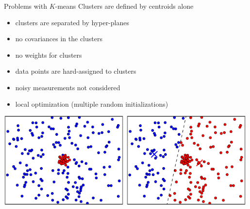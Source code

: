 \documentclass[compress,t]{beamer}
\begin{document}
\begin{frame}{Problems with $K$-means}
  Clusters are defined by \alert{centroids alone}
  \begin{itemize}
    \item clusters are separated by hyper-planes
    \item no covariances in the clusters
    \item no weights for clusters
    \item data points are hard-assigned to clusters
    \item noisy measurements not considered
    \item local optimization (multiple random initializations)
  \end{itemize}
  \begin{center}
    \includegraphics[width=0.49\textwidth]{break1-12}
    \includegraphics[width=0.49\textwidth]{break1-11}
  \end{center}
\end{frame}
\end{document}
